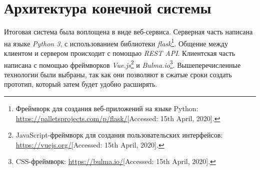 \documentclass[14pt]{matmex-diploma-custom}
\begin{document}
\section{Архитектура конечной системы}
Итоговая система была воплощена в виде веб-сервиса. Серверная часть написана на языке \textit{Python 3}, с использованием библиотеки \textit{flask}\footnote{Фреймворк для создания веб-приложений на языке Python: \url{https://palletsprojects.com/p/flask/}[Accessed: 15th April, 2020].}. Общение между клиентом и сервером происходит с помощью \textit{REST API}. Клиентская часть написана с помощью фреймворков \textit{Vue.js}\footnote{JavaScript-фреймворк для создания пользовательских интерфейсов: \url{https://vuejs.org/}[Accessed: 15th April, 2020].} и \textit{Bulma.io}\footnote{CSS-фреймворк: \url{https://bulma.io/}[Accessed: 15th April, 2020].}. Вышеперечисленные технологии были выбраны, так как они позволяют в сжатые сроки создать прототип, который затем будет удобно расширять. \par
\end{document}
